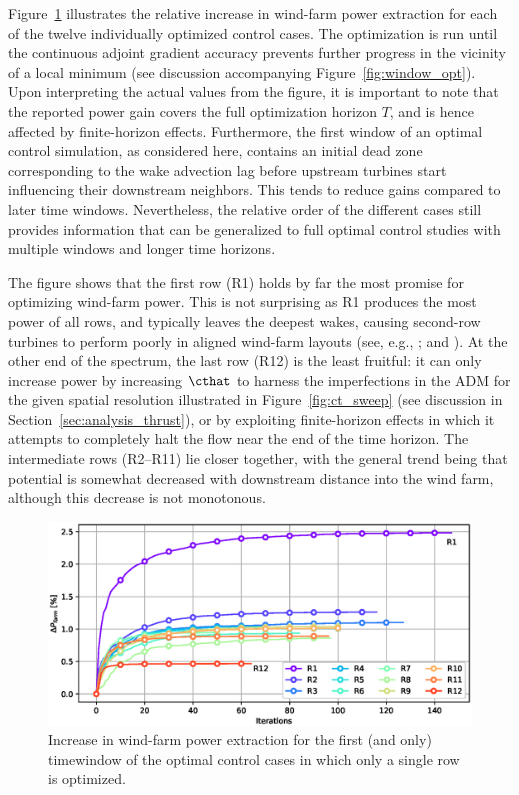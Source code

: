 	Figure~\ref{fig:single_row_opt} illustrates the relative increase in wind-farm power extraction for each of the twelve individually optimized control cases. The optimization is run until the continuous adjoint gradient accuracy prevents further progress in the vicinity of a local minimum (see discussion accompanying Figure~\ref{fig:window_opt}). Upon interpreting the actual values from the figure, it is important to note that the reported power gain covers the full optimization horizon $T$, and is hence affected by finite-horizon effects. Furthermore, the first window of an optimal control simulation, as considered here, contains an initial dead zone corresponding to the wake advection lag before upstream turbines start influencing their downstream neighbors. This tends to reduce gains compared to later time windows. Nevertheless, the relative order of the different cases still provides information that can be generalized to full optimal control studies with multiple windows and longer time horizons. 
	
	The figure shows that the first row (R1) holds by far the most promise for optimizing wind-farm power. This is not surprising as R1 produces the most power of all rows, and typically leaves the deepest wakes, causing second-row turbines to perform  poorly in aligned wind-farm layouts (see, e.g., \citealp{porte2013numerical,nilsson2015large}; and \citealp{stevens2016effects}). At the other end of the spectrum, the last row (R12) is the least fruitful: it can only increase power by increasing $\cthat$ to harness the imperfections in the ADM for the given spatial resolution illustrated in Figure~\ref{fig:ct_sweep} (see discussion in Section~\ref{sec:analysis_thrust}), or by exploiting finite-horizon effects in which it attempts to completely halt the flow near the end of the time horizon. The intermediate rows (R2--R11) lie closer together, with the general trend being that potential is somewhat decreased with downstream distance into the wind farm, although this decrease is not monotonous. 
	
	\begin{figure}
		\centering
		\includegraphics[width=\textwidth]{chapters/analysis_induction_control/single_row_opt.eps}
		\caption{Increase in wind-farm power extraction for the first (and only) timewindow of the optimal control cases in which only a single row is optimized. \label{fig:single_row_opt}}
	\end{figure}

